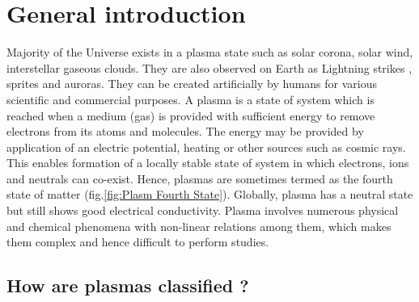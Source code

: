 \documentclass[paper=a4, fontsize=13pt]{scrartcl}
\begin{document}

\justifying

\section{General introduction}

Majority of the Universe exists in a plasma state such as solar corona, solar wind, interstellar gaseous clouds. They are also observed on Earth as Lightning strikes \cite{Bazelyan2000TheLasers} \cite{Raizer1991GasRazryada}, sprites \cite{Bourdon2007EfficientEquations} \cite{Franz1990TelevisionSystem} and auroras. They can be created artificially by humans for various scientific and commercial purposes. A plasma is a state of system which is reached when a medium (gas) is provided with sufficient energy to remove electrons from its atoms and molecules. The energy may be provided by application of an electric potential, heating or other sources such as cosmic rays. This enables formation of a locally stable state of system in which electrons, ions and neutrals can co-exist. Hence, plasmas are sometimes termed as the fourth state of matter (fig.\ref{fig:Plasm Fourth State}). Globally, plasma has a neutral state but still shows good electrical conductivity. Plasma involves numerous physical and chemical phenomena with non-linear relations among them, which makes them complex and hence difficult to perform studies. 

\subsection{How are plasmas classified ?}
\end{document}

